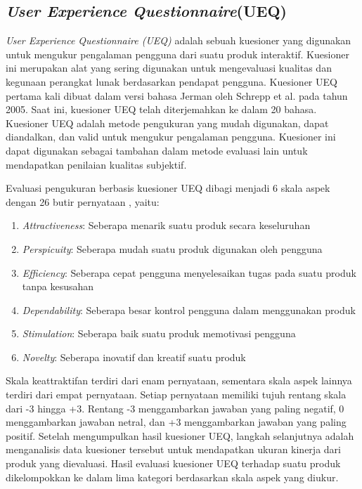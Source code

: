 \subsection{\textit{User Experience Questionnaire}(UEQ)}
\textit{User Experience Questionnaire (UEQ)} adalah sebuah kuesioner yang digunakan untuk mengukur pengalaman pengguna dari suatu produk interaktif.
Kuesioner ini merupakan alat yang sering digunakan untuk mengevaluasi kualitas dan kegunaan perangkat lunak berdasarkan pendapat pengguna. 
Kuesioner UEQ pertama kali dibuat dalam versi bahasa Jerman oleh Schrepp et al. pada tahun 2005.
Saat ini, kuesioner UEQ telah diterjemahkan ke dalam 20 bahasa. Kuesioner UEQ adalah metode pengukuran yang mudah digunakan, dapat diandalkan, dan valid untuk mengukur pengalaman pengguna.
Kuesioner ini dapat digunakan sebagai tambahan dalam metode evaluasi lain untuk mendapatkan penilaian kualitas subjektif.

Evaluasi pengukuran berbasis kuesioner UEQ dibagi menjadi 6 skala aspek 
dengan 26 butir pernyataan , yaitu:
\begin{enumerate}
	\item \textit{Attractiveness}: Seberapa menarik suatu produk secara keseluruhan 
	\item \textit{Perspicuity}:  Seberapa mudah suatu produk digunakan oleh pengguna 
	\item \textit{Efficiency}: Seberapa cepat pengguna menyelesaikan tugas pada suatu produk tanpa kesusahan 
	\item \textit{Dependability}: Seberapa besar kontrol pengguna dalam menggunakan produk  
	\item \textit{Stimulation}: Seberapa baik suatu produk memotivasi pengguna 
	\item \textit{Novelty}: Seberapa inovatif dan kreatif suatu produk 
\end{enumerate}
Skala keattraktifan terdiri dari enam pernyataan, sementara skala aspek lainnya terdiri dari empat pernyataan. Setiap pernyataan memiliki tujuh rentang skala dari -3 hingga +3. Rentang -3 menggambarkan jawaban yang paling negatif, 0 menggambarkan jawaban netral, dan +3 menggambarkan jawaban yang paling positif.
Setelah mengumpulkan hasil kuesioner UEQ, langkah selanjutnya adalah menganalisis data kuesioner tersebut untuk mendapatkan ukuran kinerja dari produk yang dievaluasi. Hasil evaluasi kuesioner UEQ terhadap suatu produk dikelompokkan ke dalam lima kategori berdasarkan skala aspek yang diukur.

